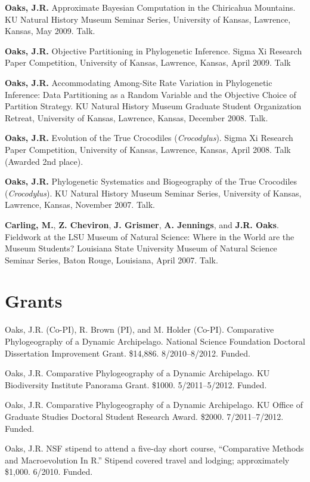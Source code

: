 \documentclass[10pt]{article}
\newcommand{\ignore}[1]{}
\newcommand{\myHangIndent}{\hangindent=5mm}
\begin{document}
\myHangIndent
{\bf Oaks, J.R.}
Approximate Bayesian Computation in the Chiricahua Mountains.
KU Natural History Museum Seminar Series, University of Kansas, Lawrence,
Kansas, May 2009.
Talk.

\myHangIndent
{\bf Oaks, J.R.}
Objective Partitioning in Phylogenetic Inference.
Sigma Xi Research Paper Competition, University of Kansas, Lawrence, Kansas,
April 2009.
Talk

\myHangIndent
{\bf Oaks, J.R.}
Accommodating Among-Site Rate Variation in Phylogenetic Inference: Data
Partitioning as a Random Variable and the Objective Choice of Partition
Strategy.
KU Natural History Museum Graduate Student Organization Retreat, University of
Kansas, Lawrence, Kansas, December 2008.
Talk.

\myHangIndent
{\bf Oaks, J.R.}
Evolution of the True Crocodiles (\emph{Crocodylus}).
Sigma Xi Research Paper Competition, University of Kansas, Lawrence, Kansas, April 2008.
Talk (Awarded 2nd place).

\myHangIndent
{\bf Oaks, J.R.}
Phylogenetic Systematics and Biogeography of the True Crocodiles
(\emph{Crocodylus}).
KU Natural History Museum Seminar Series, University of Kansas, Lawrence,
Kansas, November 2007.
Talk.

\myHangIndent
{\bf Carling, M.}, {\bf Z. Cheviron}, {\bf J. Grismer}, {\bf A. Jennings}, and
{\bf J.R. Oaks}.
Fieldwork at the LSU Museum of Natural Science: Where in the World are the
Museum Students?
Louisiana State University Museum of Natural Science Seminar Series, Baton
Rouge, Louisiana, April 2007.
Talk.

\section*{Grants}
\myHangIndent
Oaks, J.R. (Co-PI), R. Brown (PI), and M. Holder (Co-PI).
Comparative Phylogeography of a Dynamic Archipelago.
National Science Foundation Doctoral Dissertation Improvement Grant.
\$14,886.
8/2010--8/2012.
Funded.

\myHangIndent
Oaks, J.R.
Comparative Phylogeography of a Dynamic Archipelago.
KU Biodiversity Institute Panorama Grant.
\$1000.
5/2011--5/2012.
Funded.

\myHangIndent
Oaks, J.R.
Comparative Phylogeography of a Dynamic Archipelago.
KU Office of Graduate Studies Doctoral Student Research Award.
\$2000.
7/2011--7/2012.
Funded.

\ignore{
\myHangIndent
Oaks, J.R.
Comparative Phylogeography of a Dynamic Archipelago.
The Society for the Study of Evolution Rosemary Grant Graduate Research Award.
\$2,085.
7/2010--7/2011.
Not funded.
}
\myHangIndent
Oaks, J.R.
NSF stipend to attend a five-day short course, ``Comparative Methods and
Macroevolution In R.''
Stipend covered travel and lodging; approximately \$1,000.
6/2010.
Funded.
\end{document}
